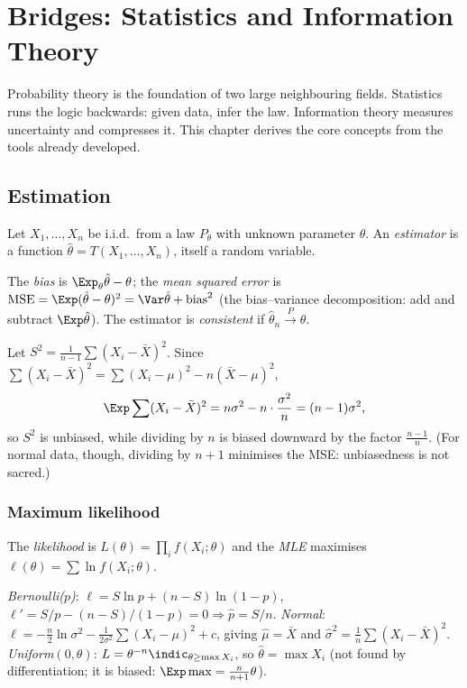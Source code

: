 \chapter{Bridges: Statistics and Information Theory}
\label{ch:bridges}

Probability theory is the foundation of two large neighbouring fields. Statistics runs the
logic backwards: given data, infer the law. Information theory measures uncertainty and
compresses it. This chapter derives the core concepts from the tools already developed.

\section{Estimation}

Let $X_1,\dots,X_n$ be i.i.d.\ from a law $P_\theta$ with unknown parameter $\theta$. An
\emph{estimator} is a function $\hat\theta=T(X_1,\dots,X_n)$, itself a random variable.

\begin{definition}
The \emph{bias} is $\Exp_\theta\hat\theta-\theta$; the \emph{mean squared error} is
$\mathrm{MSE}=\Exp(\hat\theta-\theta)^2=\Var\hat\theta+\mathrm{bias}^2$ (the bias--variance
decomposition: add and subtract $\Exp\hat\theta$). The estimator is \emph{consistent} if
$\hat\theta_n\xrightarrow{P}\theta$.
\end{definition}

\begin{example}
Let $S^2=\frac1{n-1}\sum(X_i-\bar X)^2$. Since $\sum(X_i-\bar X)^2=\sum(X_i-\mu)^2-n(\bar X-\mu)^2$,
\[
\Exp\sum(X_i-\bar X)^2=n\sigma^2-n\cdot\frac{\sigma^2}n=(n-1)\sigma^2 ,
\]
so $S^2$ is unbiased, while dividing by $n$ is biased downward by the factor $\frac{n-1}n$.
(For normal data, though, dividing by $n+1$ minimises the MSE: unbiasedness is not sacred.)
\end{example}

\subsection{Maximum likelihood}

The \emph{likelihood} is $L(\theta)=\prod_if(X_i;\theta)$ and the \emph{MLE} maximises
$\ell(\theta)=\sum\ln f(X_i;\theta)$.

\begin{example}
\emph{Bernoulli($p$)}: $\ell=S\ln p+(n-S)\ln(1-p)$, $\ell'=S/p-(n-S)/(1-p)=0\Rightarrow\hat p=S/n$.
\emph{Normal}: $\ell=-\frac n2\ln\sigma^2-\frac1{2\sigma^2}\sum(X_i-\mu)^2+c$, giving $\hat\mu=\bar X$ and
$\hat\sigma^2=\frac1n\sum(X_i-\bar X)^2$. \emph{Uniform$(0,\theta)$}: $L=\theta^{-n}\indic_{\theta\ge\max X_i}$, so
$\hat\theta=\max X_i$ (not found by differentiation; it is biased: $\Exp\max=\frac n{n+1}\theta$).
\end{example}

